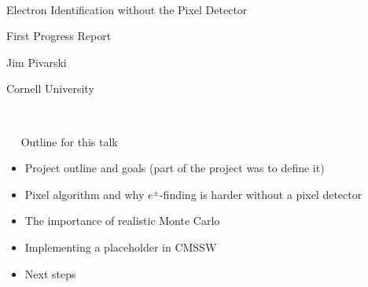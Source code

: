 \documentclass[landscape]{article}
\newenvironment{slide}[1][ ]{\mbox{\bf #1 } \vfill}{\vfill \mbox{ } \hfill \Large \arabic{page} \pagebreak}
\begin{document}
\Huge \sffamily
\renewcommand{\labelitemi}{{\LARGE $\stackrel{\bullet}{\mbox{ }}$}}
\setlength{\parindent}{0 cm}

\begin{slide}
\begin{center}
Electron Identification without the Pixel Detector

\vspace{0.5 cm}
First Progress Report

\vspace{1.5 cm}
Jim Pivarski

\vspace{0.25 cm}
Cornell University
\end{center}
\end{slide}

\begin{slide}
Outline for this talk

\vspace{1 cm}
\begin{itemize}\setlength{\itemsep}{1 cm}

\item Project outline and goals (part of the project was to define it)

\item Pixel algorithm and why $e^\pm$-finding is harder without a pixel detector

\item The importance of realistic Monte Carlo

\item Implementing a placeholder in CMSSW

\item Next steps

\end{itemize}
\end{slide}
\end{document}
